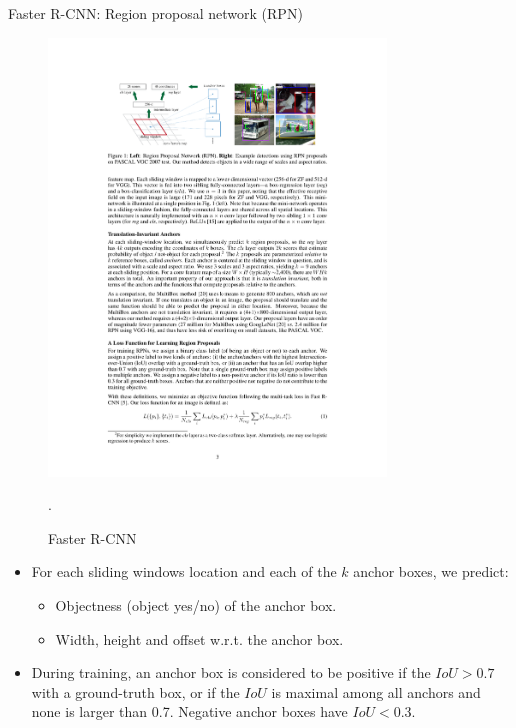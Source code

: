 \documentclass[xcolor=pdftex,dvipsnames,table]{beamer}
\begin{document}
\begin{frame}{Faster R-CNN: Region proposal network (RPN)}
\begin{figure}[htb]
   \centering
   \includegraphics[width=0.8\textwidth]{../graphics/Faster_R-CNN.pdf}
   \caption{Faster R-CNN \cite{Ren2017}}.
\end{figure}
\begin{itemize}
\item For each sliding windows location and each of the $k$ anchor boxes, we predict:
\begin{itemize}
   \item Objectness (object yes/no) of the anchor box.
   \item Width, height and offset w.r.t. the anchor box.
\end{itemize}
\item During training, an anchor box is considered to be positive if the $IoU>0.7$ with a ground-truth box, or if the $IoU$ is maximal among all anchors and none is larger than 0.7. Negative anchor boxes have $IoU<0.3$. 
\end{itemize}
\end{frame}
\end{document}
